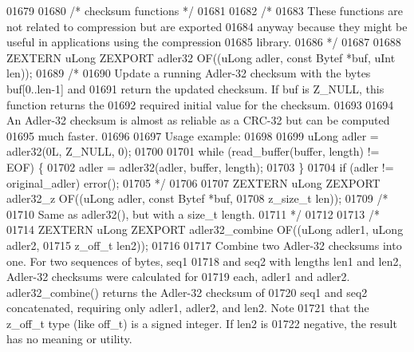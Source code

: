 \begin{DoxyCode}
01679 
01680                         \textcolor{comment}{/* checksum functions */}
01681 
01682 \textcolor{comment}{/*}
01683 \textcolor{comment}{     These functions are not related to compression but are exported}
01684 \textcolor{comment}{   anyway because they might be useful in applications using the compression}
01685 \textcolor{comment}{   library.}
01686 \textcolor{comment}{*/}
01687 
01688 ZEXTERN uLong ZEXPORT adler32 OF((uLong adler, \textcolor{keyword}{const} Bytef *buf, uInt len));
01689 \textcolor{comment}{/*}
01690 \textcolor{comment}{     Update a running Adler-32 checksum with the bytes buf[0..len-1] and}
01691 \textcolor{comment}{   return the updated checksum.  If buf is Z\_NULL, this function returns the}
01692 \textcolor{comment}{   required initial value for the checksum.}
01693 \textcolor{comment}{}
01694 \textcolor{comment}{     An Adler-32 checksum is almost as reliable as a CRC-32 but can be computed}
01695 \textcolor{comment}{   much faster.}
01696 \textcolor{comment}{}
01697 \textcolor{comment}{   Usage example:}
01698 \textcolor{comment}{}
01699 \textcolor{comment}{     uLong adler = adler32(0L, Z\_NULL, 0);}
01700 \textcolor{comment}{}
01701 \textcolor{comment}{     while (read\_buffer(buffer, length) != EOF) \{}
01702 \textcolor{comment}{       adler = adler32(adler, buffer, length);}
01703 \textcolor{comment}{     \}}
01704 \textcolor{comment}{     if (adler != original\_adler) error();}
01705 \textcolor{comment}{*/}
01706 
01707 ZEXTERN uLong ZEXPORT adler32\_z OF((uLong adler, \textcolor{keyword}{const} Bytef *buf,
01708                                     z\_size\_t len));
01709 \textcolor{comment}{/*}
01710 \textcolor{comment}{     Same as adler32(), but with a size\_t length.}
01711 \textcolor{comment}{*/}
01712 
01713 \textcolor{comment}{/*}
01714 \textcolor{comment}{ZEXTERN uLong ZEXPORT adler32\_combine OF((uLong adler1, uLong adler2,}
01715 \textcolor{comment}{                                          z\_off\_t len2));}
01716 \textcolor{comment}{}
01717 \textcolor{comment}{     Combine two Adler-32 checksums into one.  For two sequences of bytes, seq1}
01718 \textcolor{comment}{   and seq2 with lengths len1 and len2, Adler-32 checksums were calculated for}
01719 \textcolor{comment}{   each, adler1 and adler2.  adler32\_combine() returns the Adler-32 checksum of}
01720 \textcolor{comment}{   seq1 and seq2 concatenated, requiring only adler1, adler2, and len2.  Note}
01721 \textcolor{comment}{   that the z\_off\_t type (like off\_t) is a signed integer.  If len2 is}
01722 \textcolor{comment}{   negative, the result has no meaning or utility.}

\end{DoxyCode}
